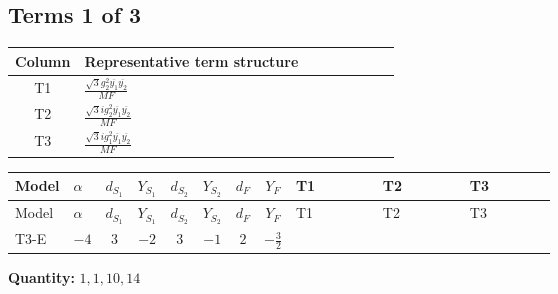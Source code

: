 \documentclass[8pt]{article}
\begin{document}
\begin{landscape}
\subsection*{Terms 1 of 3}
\begin{center}
\begin{tabular}{@{}c >{\raggedright\arraybackslash}p{0.82\linewidth}@{}}
\toprule
Column & Representative term structure \\
\midrule
T1 & \(\displaystyle \frac{\sqrt{3} g_{2}^{2} \overline{y_{1}} \overline{y_{2}}}{MF}\) \\
\midrule
T2 & \(\displaystyle \frac{\sqrt{3} i g_{2}^{2} \overline{y_{1}} \overline{y_{2}}}{MF}\) \\
\midrule
T3 & \(\displaystyle \frac{\sqrt{3} i g_{1}^{2} \overline{y_{1}} \overline{y_{2}}}{MF}\) \\
\midrule
\bottomrule
\end{tabular}
\end{center}
\smallskip
\tiny
\begin{longtable}{@{}llcccccc >{\raggedright\arraybackslash}p{0.21\linewidth} >{\raggedright\arraybackslash}p{0.21\linewidth} >{\raggedright\arraybackslash}p{0.21\linewidth}@{}}
\toprule
Model & $\alpha$ & $d_{S_1}$ & $Y_{S_1}$ & $d_{S_2}$ & $Y_{S_2}$ & $d_F$ & $Y_F$ & T1 & T2 & T3 \\
\midrule
\endfirsthead
\toprule
Model & $\alpha$ & $d_{S_1}$ & $Y_{S_1}$ & $d_{S_2}$ & $Y_{S_2}$ & $d_F$ & $Y_F$ & T1 & T2 & T3 \\
\midrule
\endhead
T3-E & $-4$ & $3$ & $-2$ & $3$ & $-1$ & $2$ & $-\frac{3}{2}$ & \scriptsize\adjustbox{max width=\linewidth}{$\begin{gathered} - \frac{\sqrt{3} g_{2}^{2} \overline{y_{1}} \overline{y_{2}}}{6 MF}\end{gathered}$} & \scriptsize\adjustbox{max width=\linewidth}{$\begin{gathered} - \frac{49 \sqrt{3} i g_{2}^{2} \overline{y_{1}} \overline{y_{2}}}{24 MF}\end{gathered}$} & \scriptsize\adjustbox{max width=\linewidth}{$\begin{gathered} - \frac{9 \sqrt{3} i g_{1}^{2} \overline{y_{1}} \overline{y_{2}}}{8 MF}\end{gathered}$} \\
\midrule
\bottomrule
\end{longtable}
\clearpage
\noindent\textbf{Quantity: }$\mathrm{1,1,10,14}$\par\smallskip

\end{landscape}
\end{document}
